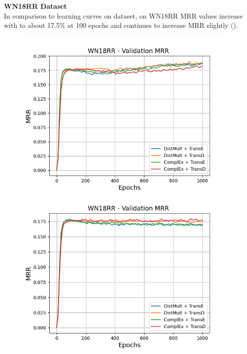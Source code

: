\textbf{WN18RR Dataset}
\label{subsubsec:uncertainty_wn18rr} \\
%
In comparison to learning curves on \umls dataset, on \textsc{WN18RR} MRR values increase with \origsampling to about 17.5\% at 100 epochs and continues to increase MRR slightly ().
\begin{figure}[H]
    \centering
    \begin{minipage}{.5\textwidth}
      \centering
      \includegraphics[width=0.9\linewidth]{figures/results/gan_train/not_pretrained/random/wn18rr/epochs1000/random_wn18rr_mrrs.png}
    \end{minipage}%
    \begin{minipage}{.5\textwidth}
      \centering
      \includegraphics[width=0.9\linewidth]{figures/results/gan_train/not_pretrained/uncertainty/max_distribution/entropy/wn18rr/1k_epochs/uncertainty_wn18rr_mrrs.png}

\end{minipage}
\end{figure}
